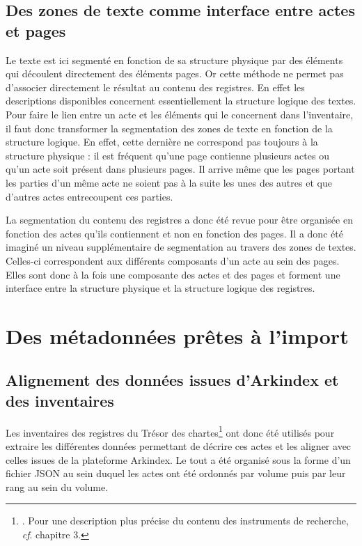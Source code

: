 \documentclass[a4paper,12pt,twoside]{book}
\begin{document}
	
	\subsection{Des zones de texte comme interface entre actes et pages}
	
	Le texte est ici segmenté en fonction de sa structure physique par des éléments qui découlent directement des éléments pages. Or cette méthode ne permet pas d'associer directement le résultat au contenu des registres. En effet les descriptions disponibles concernent essentiellement la structure logique des textes. Pour faire le lien entre un acte et les éléments qui le concernent dans l'inventaire, il faut donc transformer la segmentation des zones de texte en fonction de la structure logique. En effet, cette dernière ne correspond pas toujours à la structure physique : il est fréquent qu'une page contienne plusieurs actes ou qu'un acte soit présent dans plusieurs pages. Il arrive même que les pages portant les parties d'un même acte ne soient pas à la suite les unes des autres et que d'autres actes entrecoupent ces parties.
	
	La segmentation du contenu des registres a donc été revue pour être organisée en fonction des actes qu'ils contiennent et non en fonction des pages. Il a donc été imaginé un niveau supplémentaire de segmentation au travers des zones de textes. Celles-ci correspondent aux différents composants d'un acte au sein des pages. Elles sont donc à la fois une composante des actes et des pages et forment une interface entre la structure physique et la structure logique des registres.
	
	\section{Des métadonnées prêtes à l’import}
	
	\subsection{Alignement des données issues d'Arkindex et des inventaires}
	
	Les inventaires des registres du Trésor des chartes\footnote{\cite{glenisson_registres_1958}. Pour une description plus précise du contenu des instruments de recherche, \textit{cf}. chapitre 3.} ont donc été utilisés pour extraire les différentes données permettant de décrire ces actes et les aligner avec celles issues de la plateforme Arkindex. Le tout a été organisé sous la forme d'un fichier JSON au sein duquel les actes ont été ordonnés par volume puis par leur rang au sein du volume.
	
\end{document}
